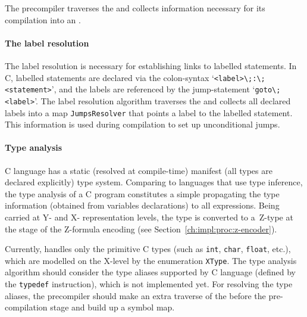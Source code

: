 The precompiler traverses the \ytree{} and collects information necessary for its compilation into an \xgraph{}.



\paragraph{The label resolution}


The label resolution is necessary for establishing links to labelled statements.
In C, labelled statements are declared via the colon-syntax `\lstinline{<label>\;:\;<statement>}', and the labels are referenced by the jump-statement `\lstinline{goto\;<label>}'.
The label resolution algorithm traverses the \ytree{} and collects all declared labels into a map \texttt{JumpsResolver} that points a label to the labelled statement.
This information is used during compilation to set up unconditional jumps.


\paragraph{Type analysis}

C language has a static (resolved at compile-time) manifest (all types are declared explicitly) type system.
Comparing to languages that use type inference, the type analysis of a C program constitutes a simple propagating the type information (obtained from variables declarations) to all expressions.
Being carried at Y- and X- representation levels, the type is converted to a~Z-type at the stage of the Z-formula encoding (see Section~\ref{ch:impl:proc:z-encoder}).

Currently, \porthos[2] handles only the primitive C types (such as \texttt{int}, \texttt{char}, \texttt{float}, etc.), which are modelled on the X-level by the enumeration \texttt{XType}.
The type analysis algorithm should consider the type aliases supported by C language (defined by the \texttt{typedef} instruction), which is not implemented yet.
For resolving the type aliases, the precompiler should make an extra traverse of the \ytree{} before the pre-compilation stage and build up a symbol map.

